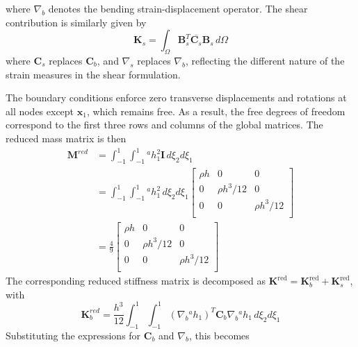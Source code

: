 \documentclass[12pt]{article}
\begin{document}
where $\nabla_b$ denotes the bending strain-displacement operator. The shear contribution is similarly given by
$$\mathbf K_s =\int_{\Omega}\mathbf B_s^T\overline{\boldsymbol{C}_s}\mathbf B_s\, d\Omega$$
where $\mathbf{C}_s$ replaces $\mathbf{C}_b$, and $\nabla_s$ replaces  $\nabla_b$, reflecting the different nature of the strain measures in the shear formulation.

The boundary conditions enforce zero transverse displacements and rotations at all nodes except $\mathbf{x}_1$, which remains free. As a result, the free degrees of freedom correspond to the first three rows and columns of the global matrices. The reduced mass matrix is then
\begin{align*}
    \mathbf M^{red} & = \int_{-1}^1\int_{-1}^1 {}^a h_1^2 \mathbf I \, d\xi_2d\xi_1                         \\
                    & =\int_{-1}^1\int_{-1}^1 {}^a h_1^2 \, d\xi_2d\xi_1 \begin{bmatrix}
                                                                             \rho h & 0           & 0           \\
                                                                             0      & \rho h^3/12 & 0           \\
                                                                             0      & 0           & \rho h^3/12 \\
                                                                         \end{bmatrix} \\
                    & = \frac{4}{9}\begin{bmatrix}
                                       \rho h & 0           & 0           \\
                                       0      & \rho h^3/12 & 0           \\
                                       0      & 0           & \rho h^3/12 \\
                                   \end{bmatrix}
\end{align*}
The corresponding reduced stiffness matrix is decomposed as $\mathbf{K}^{\text{red}} = \mathbf{K}_b^{\text{red}} + \mathbf{K}_s^{\text{red}}$, with
$$ \mathbf K^{red}_b = \frac{h^3}{12}\int_{-1}^1\int_{-1}^1 (\nabla_b{}^a h_1)^T \mathbf C_b \nabla_b{}^a h_1\, d\xi_2d\xi_1$$
Substituting the expressions for $\mathbf{C}_b$ and $\nabla_b$, this becomes
\end{document}
